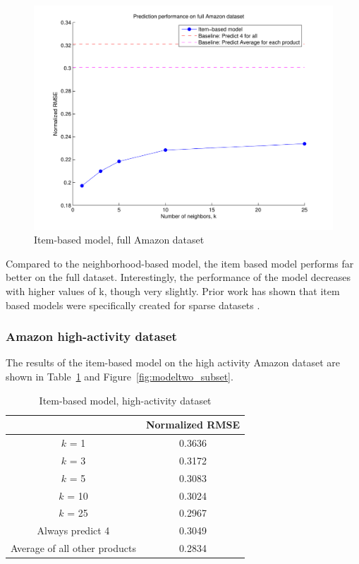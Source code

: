 \documentclass[letterpaper, 11 pt, conference]{ieeeconf}
\begin{document}
\begin{figure}[h]
\includegraphics[scale=0.5]{images/modeltwo_full.pdf}
\caption{Item-based model, full Amazon dataset}
\label{fig:modeltwo_full}
\end{figure}

Compared to the neighborhood-based model, the item based model performs
far better on the full dataset. Interestingly, the performance of the
model decreases with higher values of k, though very slightly. Prior work
has shown that item based models were specifically created for sparse
datasets \cite{bib:amazon}.

\subsubsection{Amazon high-activity dataset}
The results of the item-based model on the high activity Amazon dataset 
are shown in Table~\ref{table:modeltwo_subset} and 
Figure~\ref{fig:modeltwo_subset}.

\begin{table}[htb]
\centering
\begin{tabular}{|c|c|}
\cline{2-2}

\multicolumn{1}{c|}{}  & {Normalized RMSE} \tabularnewline \hline
$k$ = 1 & 0.3636 \tabularnewline
$k$ = 3 & 0.3172 \tabularnewline
$k$ = 5 & 0.3083 \tabularnewline
$k$ = 10 & 0.3024 \tabularnewline
$k$ = 25 & 0.2967 \tabularnewline
\hline
Always predict 4 & 0.3049 \tabularnewline 
Average of all other products & 0.2834 \tabularnewline
\hline
\end{tabular}
\caption{Item-based model, high-activity dataset}
\label{table:modeltwo_subset}
\end{table}
\end{document}
